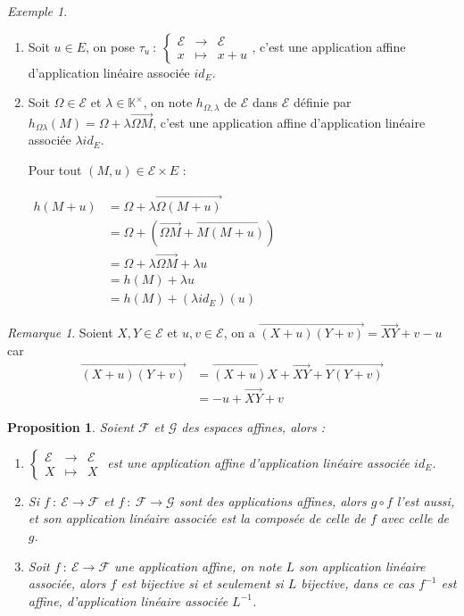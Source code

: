 \documentclass[]{article}
\newtheorem{myproposition}{Proposition}
\theoremstyle{remark}
\newtheorem{myrem}{Remarque}
\newtheorem{myexmpl}{Exemple}
\theoremstyle{definition}
\newcommand{\func}[5]{
#1 ~ : ~ \left\{ \begin{array}{lcl}
	#2 & \longrightarrow & #3 \\
	#4 & \longmapsto & #5
\end{array}
\right.
}
\newcommand{\anonfunc}[4]{
\left\{ \begin{array}{lcl}
	#1 & \longrightarrow & #2 \\
	#3 & \longmapsto & #4
\end{array}
\right.
}
\newcommand{\funcshort}[3]{
#1 ~ : ~ #2 \longrightarrow #3
}
\begin{document}
\begin{myexmpl}
	\leavevmode
	
	\begin{enumerate}
		\item Soit $u \in E$, on pose $\func{\tau_u}{\mathcal{E}}{\mathcal{E}}{x}{x + u}$, c'est une application affine d'application linéaire associée $id_E$.
		
		\item Soit $\Omega \in \mathcal{E}$ et $\lambda \in \mathbb{K}^{\times}$, on note $h_{\Omega, \lambda}$ de $\mathcal{E}$ dans $\mathcal{E}$ définie par $h_{\Omega \lambda}(M) = \Omega + \lambda \overrightarrow{\Omega M}$, c'est une application affine d'application linéaire associée $\lambda id_E$.
		
		Pour tout $(M, u) \in \mathcal{E} \times E$ :
		
		$\begin{aligned}
		   h(M+u)& = \Omega + \lambda \overrightarrow{\Omega(M+u)} \\
		   & = \Omega + \left(\overrightarrow{\Omega M} + \overrightarrow{M(M+u)}\right) \\
		   & = \Omega + \lambda \overrightarrow{\Omega M} + \lambda u \\
		   & = h(M) + \lambda u \\
		   & = h(M) + (\lambda id_E)(u)
		 \end{aligned}$
		
	\end{enumerate}
\end{myexmpl}

\begin{myrem}
	Soient $X, Y \in \mathcal{E}$ et $u, v \in \mathcal{E}$, on a $\overrightarrow{(X+u)(Y+v)} = \overrightarrow{XY} + v - u$ car
	$$\begin{aligned}
		\overrightarrow{(X+u)(Y+v)}& = \overrightarrow{(X+u)X} + \overrightarrow{XY} + \overrightarrow{Y(Y+v)}	\\
		& = -u + \overrightarrow{XY} + v
	\end{aligned}$$
\end{myrem}

\begin{myproposition}
	Soient $\mathcal{F}$ et $\mathcal{G}$ des espaces affines, alors :
	\begin{enumerate}
		\item $\anonfunc{\mathcal{E}}{\mathcal{E}}{X}{X}$ est une application affine d'application linéaire associée $id_E$.
		
		\item Si $\funcshort{f}{\mathcal{E}}{\mathcal{F}}$ et $\funcshort{f}{\mathcal{F}}{\mathcal{G}}$ sont des applications affines, alors $g \circ f$ l'est aussi, et son application linéaire associée est la composée de celle de $f$ avec celle de $g$.
		
		\item Soit $\funcshort{f}{\mathcal{E}}{\mathcal{F}}$ une application affine, on note $L$ son application linéaire associée, alors $f$ est bijective si et seulement si $L$ bijective, dans ce cas $f^{-1}$ est affine, d'application linéaire associée $L^{-1}$.
	\end{enumerate}
\end{myproposition}
\end{document}
